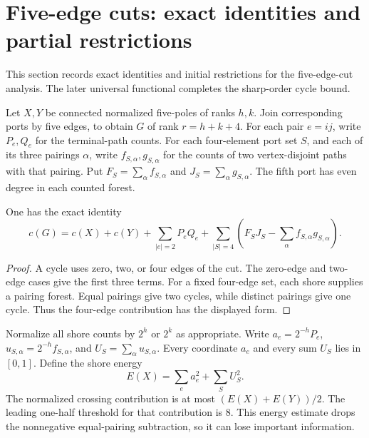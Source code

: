 \section{Five-edge cuts: exact identities and partial restrictions}
\label{sec:five-cut-partial}

This section records exact identities and initial restrictions for the five-edge-cut analysis.
The later universal functional completes the sharp-order cycle bound.

Let $X,Y$ be connected normalized five-poles of ranks $h,k$.
Join corresponding ports by five edges, to obtain $G$ of rank $r=h+k+4$.
For each pair $e=ij$, write $P_e,Q_e$ for the terminal-path counts.
For each four-element port set $S$, and each of its three pairings $\alpha$, write
$f_{S,\alpha},g_{S,\alpha}$ for the counts of two vertex-disjoint paths with that pairing.
Put $F_S=\sum_\alpha f_{S,\alpha}$ and $J_S=\sum_\alpha g_{S,\alpha}$.
The fifth port has even degree in each counted forest.

\begin{proposition}
\label{prop:five-cut-gluing}
One has the exact identity
\[
 c(G)=c(X)+c(Y)+\sum_{|e|=2}P_eQ_e
 +\sum_{|S|=4}\left(F_SJ_S-\sum_\alpha f_{S,\alpha}g_{S,\alpha}\right).
\]
\end{proposition}
\begin{proof}
A cycle uses zero, two, or four edges of the cut.
The zero-edge and two-edge cases give the first three terms.
For a fixed four-edge set, each shore supplies a pairing forest.
Equal pairings give two cycles, while distinct pairings give one cycle.
Thus the four-edge contribution has the displayed form.
\end{proof}

Normalize all shore counts by $2^h$ or $2^k$ as appropriate.
Write $a_e=2^{-h}P_e$, $u_{S,\alpha}=2^{-h}f_{S,\alpha}$, and $U_S=\sum_\alpha u_{S,\alpha}$.
Every coordinate $a_e$ and every sum $U_S$ lies in $[0,1]$.
Define the shore energy
\[
 E(X)=\sum_e a_e^2+\sum_S U_S^2.
\]
The normalized crossing contribution is at most $(E(X)+E(Y))/2$.
The leading one-half threshold for that contribution is $8$.
This energy estimate drops the nonnegative equal-pairing subtraction, so it can lose important information.


